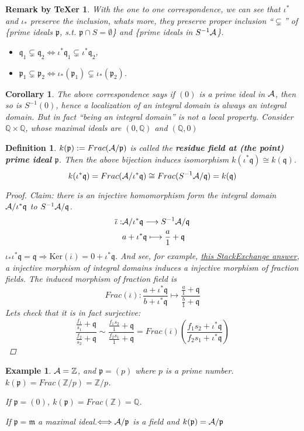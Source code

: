 \documentclass[11pt]{article}
\newtheorem{cor}[thm]{Corollary}
\newtheorem{dfn}[thm]{Definition}
\newtheorem{rmkt}[thm]{Remark by TeXer}
\newtheorem{ex}[thm]{Example}
\newcommand{\intg}{\mathbb Z}
\newcommand{\ratl}{\mathbb Q}
\newcommand{\scm}{{\mathfrak m}}
\newcommand{\scp}{{\mathfrak p}}
\newcommand{\scq}{\mathfrak q}
\newcommand{\cala}{{\cal A}}
\newcommand{\Lrta}{\Longrightarrow}
\newcommand{\lrta}{\longrightarrow}
\newcommand{\Llrta}{\Longleftrightarrow}
\begin{document}
\begin{rmkt}
With the one to one correspondence, we can see that $\iota^*$ and $\iota_*$ preserve the inclusion, whats more, they preserve proper inclusion ``$\subsetneq$'' of \{prime ideals $\scp$, s.t. $\scp\cap S=\emptyset$\} and \{prime ideals in $S^{-1}\cala$\}.
\begin{itemize}
\item $\scq_1\subsetneq \scq_2\Llrta \iota^*\scq_1\subsetneq \iota^*\scq_2$,
\item $\scp_1\subsetneq \scp_2\Llrta\iota_*(\scp_1)\subsetneq\iota_*(\scp_2)$.
\end{itemize}
\end{rmkt}

\begin{cor}
The above correspondence says if $(0)$ is a prime ideal in $\cala$, then so is $S^{-1}(0)$, hence a localization of an integral domain is always an integral domain. But in fact ``being an integral domain'' is not a local property. Consider $\ratl\times\ratl$, whose maximal ideals are $(0,\ratl)$ and $(\ratl,0)$
\end{cor}

\begin{dfn}
$k(\scp):=Frac(\cala/\scp)$ is called the \textbf{residue field at (the point) prime ideal $\scp$}.
Then the above bijection induces isomorphism $k(\iota^*\scq)\cong k(\scq)$.
$$
k(\iota^*\scq)=Frac(\cala/\iota^*\scq)\cong Frac(S^{-1}\cala/\scq)=k(\scq)
$$
{\color{red}
\begin{proof}
Claim: there is an injective homomorphism form the integral domain $\cala/\iota^*\scq$ to $S^{-1}\cala/\scq$.
$$
\begin{aligned}
\overline{\iota}:&\cala/\iota^* \scq\lrta S^{-1}\cala/\scq\\
& a+\iota^*\scq\longmapsto \frac{a}{1}+\scq
\end{aligned}
$$
$\iota_*\iota^*\scq=\scq\Lrta \text{Ker}(\overline{\iota})=0+\iota^*\scq$. And see, for example,  
 \href{https://math.stackexchange.com/questions/2123201/relation-between-integral-domains-with-isomorphic-fraction-fields}{this StackExchange answer}, a injective morphism of integral domains induces a injective morphism of fraction fields. The induced morphism of fraction field is 
 $$
 Frac(\overline{\iota}):\frac{a+\iota^*\scq}{b+\iota^*\scq}\longmapsto \frac{\frac{a}{1}+\scq}{\frac{b}{1}+\scq}
 $$
 Lets check that it is in fact surjective: 
 $$
 \frac{\frac{f_1}{s_1}+\scq}{\frac{f_2}{s_2}+\scq}\sim \frac{\frac{f_1 s_2}{1}+\scq}{\frac{f_2 s_1}{1}+\scq}=Frac(\overline{\iota})\left(\frac{f_1 s_2+\iota^*\scq}{f_2 s_1+\iota^*\scq}\right)
 $$
\end{proof}}
\end{dfn}
\begin{ex}
$\cala=\intg$, and $\scp=(p)$ where $p$ is a prime number. $k(\scp)=Frac(\intg/p)=\intg/p$.

If $\scp=(0)$, $k(\scp)=Frac(\intg)=\ratl$.

If $\scp=\scm$ a  maximal ideal.$\Llrta\cala/\scp$ is a field and $k(\scp)=\cala/\scp$ 
\end{ex}
\end{document}
